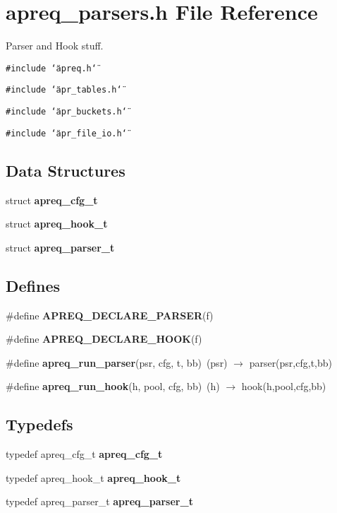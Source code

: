 \section{apreq\_\-parsers.h File Reference}
\label{apreq__parsers_8h}
Parser and Hook stuff. 


{\tt \#include \char`\"{}apreq.h\char`\"{}}\par
{\tt \#include \char`\"{}apr\_\-tables.h\char`\"{}}\par
{\tt \#include \char`\"{}apr\_\-buckets.h\char`\"{}}\par
{\tt \#include \char`\"{}apr\_\-file\_\-io.h\char`\"{}}\par
\subsection*{Data Structures}
\begin{CompactItemize}
\item 
struct {\bf apreq\_\-cfg\_\-t}
\item 
struct {\bf apreq\_\-hook\_\-t}
\item 
struct {\bf apreq\_\-parser\_\-t}
\end{CompactItemize}
\subsection*{Defines}
\begin{CompactItemize}
\item 
\#define {\bf APREQ\_\-DECLARE\_\-PARSER}(f)
\item 
\#define {\bf APREQ\_\-DECLARE\_\-HOOK}(f)
\item 
\#define {\bf apreq\_\-run\_\-parser}(psr, cfg, t, bb)\ (psr) $\rightarrow$ parser(psr,cfg,t,bb)\label{apreq__parsers_8h_a13}

\item 
\#define {\bf apreq\_\-run\_\-hook}(h, pool, cfg, bb)\ (h) $\rightarrow$ hook(h,pool,cfg,bb)\label{apreq__parsers_8h_a14}

\end{CompactItemize}
\subsection*{Typedefs}
\begin{CompactItemize}
\item 
typedef apreq\_\-cfg\_\-t {\bf apreq\_\-cfg\_\-t}
\item 
typedef apreq\_\-hook\_\-t {\bf apreq\_\-hook\_\-t}\label{apreq__parsers_8h_a1}

\item 
typedef apreq\_\-parser\_\-t {\bf apreq\_\-parser\_\-t}\label{apreq__parsers_8h_a2}

\end{CompactItemize}
